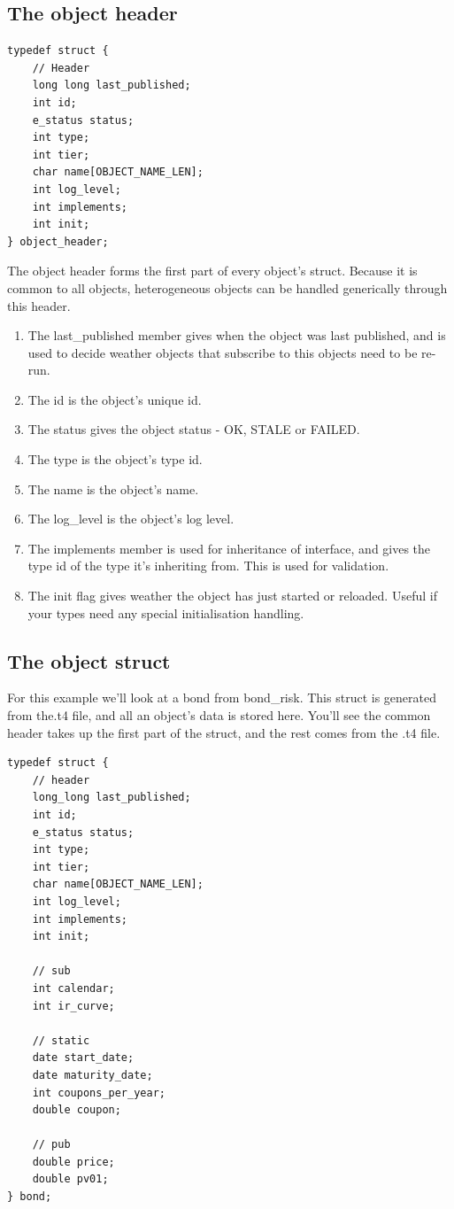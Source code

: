 \documentclass{report}
\begin{document}
\subsection{The object header}

\begin{verbatim}
typedef struct {
    // Header
    long long last_published;
    int id;
    e_status status;
    int type;
    int tier;
    char name[OBJECT_NAME_LEN];
    int log_level;
    int implements;
    int init;
} object_header;
\end{verbatim}

The object header forms the first part of every object's struct. Because it is common to all objects, heterogeneous objects can be handled generically through this header.


\begin{enumerate}
\item The last_published member gives when the object was last published, and is used to decide weather objects that subscribe to this objects need to be re-run.
\item The id is the object's unique id.
\item The status gives the object status - OK, STALE or FAILED.
\item The type is the object's type id.
\item The name is the object's name.
\item The log_level is the object's log level.
\item The implements member is used for inheritance of interface, and gives the type id of the type it's inheriting from. This is used for validation.
\item The init flag gives weather the object has just started or reloaded. Useful if your types need any special initialisation handling.
\end{enumerate}

\subsection{The object struct}

For this example we'll look at a bond from bond_risk. This struct is generated from the.t4 file, and all an object's data is stored here. You'll see the common header takes up the first part of the struct, and the rest comes from the .t4 file.

\begin{verbatim}
typedef struct {
    // header
    long_long last_published;
    int id;
    e_status status;
    int type;
    int tier;
    char name[OBJECT_NAME_LEN];
    int log_level;
    int implements;
    int init;

    // sub
    int calendar;
    int ir_curve;

    // static
    date start_date;
    date maturity_date;
    int coupons_per_year;
    double coupon;

    // pub
    double price;
    double pv01;
} bond;
\end{verbatim}
\end{document}
